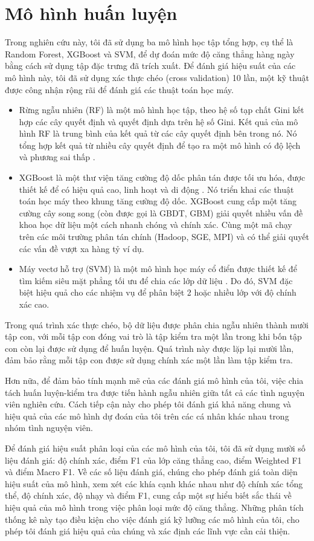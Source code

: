 \section{Mô hình huấn luyện}
Trong nghiên cứu này, tôi đã sử dụng ba mô hình học tập tổng hợp, cụ thể là Random Forest, XGBoost và SVM, để dự đoán mức độ căng thẳng hàng ngày bằng cách sử dụng tập đặc trưng đã trích xuất. Để đánh giá hiệu suất của các mô hình này, tôi đã sử dụng xác thực chéo (cross validation) 10 lần, một kỹ thuật được công nhận rộng rãi để đánh giá các thuật toán học máy.
\begin{itemize}
    \item Rừng ngẫu nhiên (RF) là một mô hình học tập, theo hệ số tạp chất Gini kết hợp các cây quyết định và quyết định dựa trên hệ số Gini. Kết quả của mô hình RF là trung bình của kết quả từ các cây quyết định bên trong nó. Nó tổng hợp kết quả từ nhiều cây quyết định để tạo ra một mô hình có độ lệch và phương sai thấp \cite{rf}.
    \item XGBoost là một thư viện tăng cường độ dốc phân tán được tối ưu hóa, được thiết kế để có hiệu quả cao, linh hoạt và di động \cite{xgb}. Nó triển khai các thuật toán học máy theo khung tăng cường độ dốc. XGBoost cung cấp một tăng cường cây song song (còn được gọi là GBDT, GBM) giải quyết nhiều vấn đề khoa học dữ liệu một cách nhanh chóng và chính xác. Cùng một mã chạy trên các môi trường phân tán chính (Hadoop, SGE, MPI) và có thể giải quyết các vấn đề vượt xa hàng tỷ ví dụ.
    \item Máy vectơ hỗ trợ (SVM) là một mô hình học máy cổ điển được thiết kế để tìm kiếm siêu mặt phẳng tối ưu để chia các lớp dữ liệu \cite{SVM}. Do đó, SVM đặc biệt hiệu quả cho các nhiệm vụ để phân biệt 2 hoặc nhiều lớp với độ chính xác cao.
\end{itemize}
Trong quá trình xác thực chéo, bộ dữ liệu được phân chia ngẫu nhiên thành mười tập con, với mỗi tập con đóng vai trò là tập kiểm tra một lần trong khi bốn tập con còn lại được sử dụng để huấn luyện. Quá trình này được lặp lại mười lần, đảm bảo rằng mỗi tập con được sử dụng chính xác một lần làm tập kiểm tra.

Hơn nữa, để đảm bảo tính mạnh mẽ của các đánh giá mô hình của tôi, việc chia tách huấn luyện-kiểm tra được tiến hành ngẫu nhiên giữa tất cả các tình nguyện viên nghiên cứu. Cách tiếp cận này cho phép tôi đánh giá khả năng chung và hiệu quả của các mô hình dự đoán của tôi trên các cá nhân khác nhau trong nhóm tình nguyện viên.

Để đánh giá hiệu suất phân loại của các mô hình của tôi, tôi đã sử dụng mười số liệu đánh giá: độ chính xác, điểm F1 của lớp căng thẳng cao, điểm Weighted F1 và điểm Macro F1. 
Về các số liệu đánh giá, chúng cho phép đánh giá toàn diện hiệu suất của mô hình, xem xét các khía cạnh khác nhau như độ chính xác tổng thể, độ chính xác, độ nhạy và điểm F1, cung cấp một sự hiểu biết sắc thái về hiệu quả của mô hình trong việc phân loại mức độ căng thẳng. Những phân tích thống kê này tạo điều kiện cho việc đánh giá kỹ lưỡng các mô hình của tôi, cho phép tôi đánh giá hiệu quả của chúng và xác định các lĩnh vực cần cải thiện.

